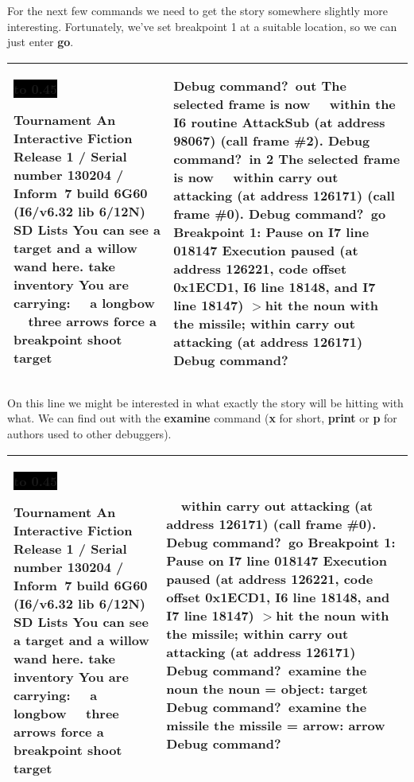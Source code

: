 \documentclass{book}
\newcommand{\n}{\hspace*{\fill}\newline}
\newcommand{\terp}[2]{\begin{center}\begin{tabular}{p{0.45\textwidth}|p{0.45\textwidth}}\midrule #1&#2\\\midrule\end{tabular}\end{center}}
\newcommand{\glkheading}[1]{\textbf{#1}}
\newcommand{\glkinput}[1]{\textbf{#1}}
\newcommand{\glkstatusline}[2]{\centerline{\colorbox{black}{\hbox to 0.45\textwidth{\textcolor{white}{#1\hfil #2}}}}}
\newcommand{\storyprompt}{\raisebox{1.5pt}{\(>\)}}
\newcommand{\cursor}{\raisebox{-1.5pt}{\RectangleThin}}
\newcommand{\markedindent}{\(>\)\qquad}
\begin{document}
For the next few commands we need to get the story somewhere slightly more
interesting.  Fortunately, we've set breakpoint 1 at a suitable location, so we
can just enter \glkinput{go}.

\pagebreak

\terp{\glkstatusline{Lists}{0/2}\n
  \glkheading{Tournament}\n
  An Interactive Fiction\n
  Release 1 / Serial number 130204 / Inform~7 build 6G60 (I6/v6.32 lib 6/12N) SD\n
  \n
  \glkheading{Lists}\n
  You can see a target and a willow wand here.\n
  \n
  \storyprompt\glkinput{take inventory}\n
  You are carrying:\n
  \null\ \ a longbow\n
  \null\ \ three arrows\n
  \n
  \storyprompt\glkinput{force a breakpoint}\n
  \storyprompt\glkinput{shoot target}}{%
  Debug command?\ \glkinput{out}\n
  \n
  The selected frame is now\n
  \null\ \ within the I6 routine AttackSub (at address 98067) (call frame \#2).\n
  \n
  Debug command?\ \glkinput{in 2}\n
  \n
  The selected frame is now\n
  \null\ \ within carry out attacking (at address 126171) (call frame \#0).\n
  \n
  Debug command?\ \glkinput{go}\n
  \n
  \glkheading{Breakpoint 1:} Pause on I7 line 018147\n
  \n
  Execution paused (at address 126221, code offset 0x1ECD1, I6 line 18148, and I7 line 18147)\n
  \markedindent hit the noun with the missile;\n
  within carry out attacking (at address 126171)\n
  \n
  Debug command?\ \cursor}

On this line we might be interested in what exactly the story will be hitting
with what.  We can find out with the \glkinput{examine} command (\glkinput{x}
for short, \glkinput{print} or \glkinput{p} for authors used to other
debuggers).

\terp{\glkstatusline{Lists}{0/2}\n
  \glkheading{Tournament}\n
  An Interactive Fiction\n
  Release 1 / Serial number 130204 / Inform~7 build 6G60 (I6/v6.32 lib 6/12N) SD\n
  \n
  \glkheading{Lists}\n
  You can see a target and a willow wand here.\n
  \n
  \storyprompt\glkinput{take inventory}\n
  You are carrying:\n
  \null\ \ a longbow\n
  \null\ \ three arrows\n
  \n
  \storyprompt\glkinput{force a breakpoint}\n
  \storyprompt\glkinput{shoot target}}{%
  \ \ within carry out attacking (at address 126171) (call frame \#0).\n
  \n
  Debug command?\ \glkinput{go}\n
  \n
  \glkheading{Breakpoint 1:} Pause on I7 line 018147\n
  \n
  Execution paused (at address 126221, code offset 0x1ECD1, I6 line 18148, and I7 line 18147)\n
  \markedindent hit the noun with the missile;\n
  within carry out attacking (at address 126171)\n
  \n
  Debug command?\ \glkinput{examine the noun}\n
  \n
  the noun = object: target\n
  \n
  Debug command?\ \glkinput{examine the missile}\n
  \n
  the missile = arrow: arrow\n
  \n
  Debug command?\ \cursor}
\end{document}
